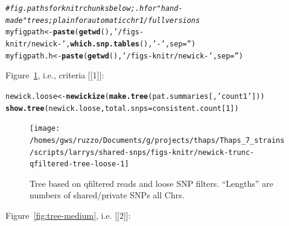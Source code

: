 \documentclass{article}\usepackage[]{graphicx}\usepackage[]{color}
\makeatletter
\newcommand{\hlnum}[1]{\textcolor[rgb]{0.686,0.059,0.569}{#1}}%
\newcommand{\hlstr}[1]{\textcolor[rgb]{0.192,0.494,0.8}{#1}}%
\newcommand{\hlcom}[1]{\textcolor[rgb]{0.678,0.584,0.686}{\textit{#1}}}%
\newcommand{\hlstd}[1]{\textcolor[rgb]{0.345,0.345,0.345}{#1}}%
\newcommand{\hlkwb}[1]{\textcolor[rgb]{0.69,0.353,0.396}{#1}}%
\newcommand{\hlkwc}[1]{\textcolor[rgb]{0.333,0.667,0.333}{#1}}%
\newcommand{\hlkwd}[1]{\textcolor[rgb]{0.737,0.353,0.396}{\textbf{#1}}}%
\newenvironment{kframe}{%
 \def\at@end@of@kframe{}%
 \ifinner\ifhmode%
  \def\at@end@of@kframe{\end{minipage}}%
  \begin{minipage}{\columnwidth}%
 \fi\fi%
 \def\FrameCommand##1{\hskip\@totalleftmargin \hskip-\fboxsep
 \colorbox{shadecolor}{##1}\hskip-\fboxsep
     \hskip-\linewidth \hskip-\@totalleftmargin \hskip\columnwidth}%
 \MakeFramed {\advance\hsize-\width
   \@totalleftmargin\z@ \linewidth\hsize
   \@setminipage}}%
 {\par\unskip\endMakeFramed%
 \at@end@of@kframe}
\newenvironment{knitrout}{}{} %
\makeatother
\begin{document}
\begin{knitrout}\scriptsize
{}\color{fgcolor}\begin{kframe}
\begin{alltt}
\hlcom{# fig.paths for knitr chunks below;  .h for "hand-made" trees; plain for automatic chr1/full versions}
\hlstd{myfigpath}   \hlkwb{<-} \hlkwd{paste}\hlstd{(}\hlkwd{getwd}\hlstd{(),} \hlstr{'/figs-knitr/newick-'}\hlstd{,} \hlkwd{which.snp.tables}\hlstd{(),} \hlstr{'-'}\hlstd{,} \hlkwc{sep}\hlstd{=}\hlstr{''}\hlstd{)}
\hlstd{myfigpath.h} \hlkwb{<-} \hlkwd{paste}\hlstd{(}\hlkwd{getwd}\hlstd{(),} \hlstr{'/figs-knitr/newick-'}\hlstd{,} \hlkwc{sep}\hlstd{=}\hlstr{''}\hlstd{)}
\end{alltt}
\end{kframe}
\end{knitrout}

Figure~\ref{fig:tree-loose}, i.e., criteria [[1]]:

\begin{knitrout}\scriptsize
{}\color{fgcolor}\begin{kframe}
\begin{alltt}
\hlstd{newick.loose} \hlkwb{<-} \hlkwd{newickize}\hlstd{(}\hlkwd{make.tree}\hlstd{(pat.summaries[,}\hlstr{'count1'}\hlstd{]))}
\hlkwd{show.tree}\hlstd{(newick.loose,} \hlkwc{total.snps}\hlstd{=consistent.count[}\hlnum{1}\hlstd{])}
\end{alltt}
\end{kframe}\begin{figure}

{\centering \texttt{[image: /homes/gws/ruzzo/Documents/g/projects/thaps/Thaps\_7\_strains/scripts/larrys/shared-snps/figs-knitr/newick-trunc-qfiltered-tree-loose-1]} 

}

\caption[Tree based on qfiltered reads and loose SNP filters]{Tree based on qfiltered reads and loose SNP filters.  ``Lengths'' are numbers of shared/private SNPs all Chrs.}\label{fig:tree-loose}
\end{figure}


\end{knitrout}

Figure~\ref{fig:tree-medium}, i.e. [[2]]:
\end{document}
